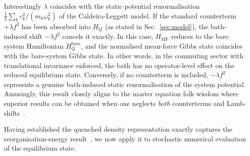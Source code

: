 Interestingly $\lambda$ coincides with the static potential renormalisation
$\frac{1}{2}\sum_k c_k^2/(m_k\omega_k^2)$ of the Caldeira-Leggett model. If the standard counterterm $+\lambda f^2$ has been absorbed into $H_Q$ (as stated in Sec.~\ref{sec:model}), the bath-induced shift $-\lambda f^2$ cancels it exactly. In this case, $H_{\mathrm{MF}}$ reduces to the bare system Hamiltonian $H_Q^{\mathrm{bare}}$, and the normalised mean-force Gibbs state coincides with the bare-system Gibbs state. In other words, in the commuting sector with translational invariance enforced, the bath has no operator-level effect on the reduced equilibrium
state. Conversely, if no counterterm is included, $-\lambda f^2$ represents a genuine
bath-induced static renormalisation of the system potential. Amusingly, this result closely aligns to the master equation folk wisdom where superior results can be obtained when one neglects \emph{both} counterterms and Lamb-shifts~\cite{correaPotentialRenormalisationLamb2025}.

Having established the quenched density representation exactly captures the reorganisation-energy result~\cite{campisiTalknerHanggi2009Solvable}, we now apply it to stochastic numerical evaluation of the equilibrium state.


